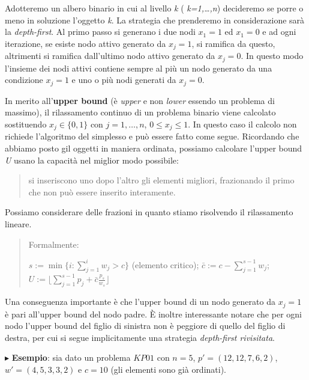 \documentclass[11pt]{book}
\begin{document}
Adotteremo un albero binario in cui al livello {\em k} ({\em
  k=1,\dots,n}) decideremo se porre o meno in soluzione l'oggetto {\em
  k}. La strategia che prenderemo in considerazione sar\`a la {\em
  depth-first}. Al primo passo si generano i due nodi $x_1 = 1$ ed
$x_1 = 0$ e ad ogni iterazione, se esiste nodo attivo generato da
$x_j=1$, si ramifica da questo, altrimenti si ramifica dall'ultimo
nodo attivo generato da $x_j = 0$. In questo modo l'insieme dei nodi
attivi contiene sempre al pi\`u un nodo generato da una condizione
$x_j = 1$ e uno o pi\`u nodi generati da $x_j = 0$.

In merito all'{\bf upper bound} (\`e {\em upper} e non {\em lower}
essendo un problema di massimo), il rilassamento continuo di un
problema binario viene calcolato sostituendo $x_j \in \{0,1\}$ con $j
= 1, \dots, n$, $0 \leq x_j \leq 1$. In questo caso il calcolo non
richiede l'algoritmo del simplesso e pu\`o essere fatto come segue.
Ricordando che abbiamo posto gil oggetti in maniera ordinata, possiamo
calcolare l'upper bound {\em U} usano la capacit\`a nel miglior modo
possibile:

\begin{quote}
si inseriscono uno dopo l'altro gli elementi migliori, frazionando il
primo che non pu\`o essere inserito interamente.  
\end{quote}

Possiamo considerare delle frazioni in quanto stiamo risolvendo il
rilassamento lineare.

\begin{quote}
Formalmente:
\begin{center}
$s := \min \{i: \sum\limits_{j=1}^{i}w_j > c \}$ (elemento critico);
  $\bar{c} := c-\sum\limits_{j=1}^{s-1}w_j$;\\
$U := \biggr\lfloor \sum\limits_{j=1}^{s-1}p_j + \bar{c}\frac{p_s}{w_s}\biggr\rfloor$
\end{center}
\end{quote}
  
Una conseguenza importante \`e che l'upper bound di un nodo generato
da $x_j = 1$ \`e pari all'upper bound del nodo padre. \`E inoltre
interessante notare che per ogni nodo l'upper bound del figlio di
sinistra non \`e peggiore di quello del figlio di destra, per cui si
segue implicitamente una strategia {\em depth-first rivisitata}.

\vspace{11pt}
$\blacktriangleright$ {\bf Esempio}: sia dato un problema $KP01$ con
$n=5$, $p' = (12,12,7,6,2)$, $w'=(4,5,3,3,2)$ e $c=10$ (gli elementi
sono gi\`a ordinati).
\end{document}
